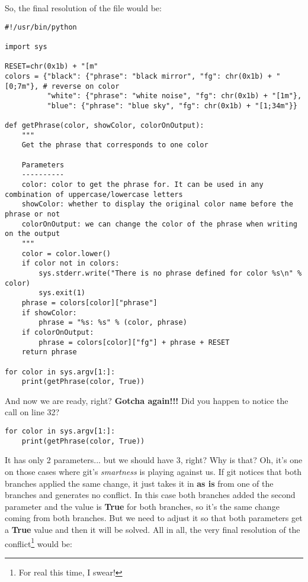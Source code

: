 So, the final resolution of the file would be:

\begin{lstlisting}[style=python_style,
	basicstyle=\small,
	caption={\bf example 16} - solved conflict]
#!/usr/bin/python

import sys

RESET=chr(0x1b) + "[m"
colors = {"black": {"phrase": "black mirror", "fg": chr(0x1b) + "[0;7m"}, # reverse on color
          "white": {"phrase": "white noise", "fg": chr(0x1b) + "[1m"},
          "blue": {"phrase": "blue sky", "fg": chr(0x1b) + "[1;34m"}}

def getPhrase(color, showColor, colorOnOutput):
    """
    Get the phrase that corresponds to one color
    
    Parameters
    ----------
    color: color to get the phrase for. It can be used in any combination of uppercase/lowercase letters
    showColor: whether to display the original color name before the phrase or not
    colorOnOutput: we can change the color of the phrase when writing on the output
    """
    color = color.lower()
    if color not in colors:
        sys.stderr.write("There is no phrase defined for color %s\n" % color)
        sys.exit(1)
    phrase = colors[color]["phrase"]
    if showColor:
        phrase = "%s: %s" % (color, phrase)
    if colorOnOutput:
        phrase = colors[color]["fg"] + phrase + RESET
    return phrase

for color in sys.argv[1:]:
    print(getPhrase(color, True))
\end{lstlisting}

And now we are ready, right? {\bf Gotcha again!!!} Did you happen to notice the call on line 32?

\begin{lstlisting}[style=python_style,
	firstnumber=31,
	basicstyle=\small,
	caption={\bf example 16} - call that needs to be adusted]
for color in sys.argv[1:]:
    print(getPhrase(color, True))
\end{lstlisting}

It has only 2 parameters... but we should have 3, right? Why is that? Oh, it's one on those cases where git's {\it smartness} is playing
against us. If git notices that both branches applied the same change, it just takes it in {\bf as is} from one of the branches and
generates no conflict. In this case both branches added the second parameter and the value is {\bf True} for both branches, so it's
the same change coming from both branches. But we need to adjust it so that both parameters get a {\bf True} value and then it will
be solved. All in all, the very final resolution of the conflict\footnote{For real this time, I swear!} would be:

